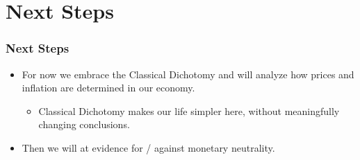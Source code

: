 \documentclass[english,xcolor=svgnames]{beamer}
\begin{document}
\section{Next Steps}


\begin{frame}
\frametitle{Next Steps
}
\begin{itemize}
	\item For now we embrace the Classical Dichotomy and will analyze how prices and inflation are determined in our economy.
	\begin{itemize}
		\item Classical Dichotomy makes our life simpler here, without meaningfully changing conclusions.
	\end{itemize}
	\item Then we will at evidence for / against monetary neutrality.
\end{itemize}
\end{frame}
\end{document}
